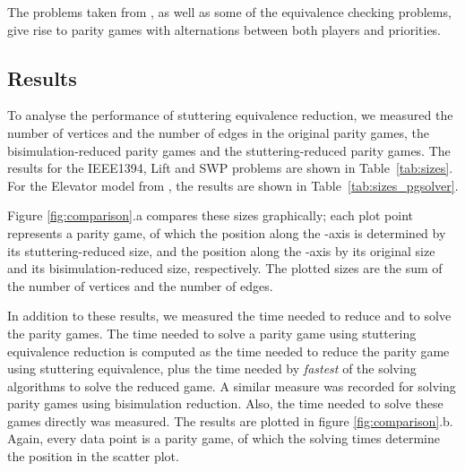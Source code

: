 \documentclass[a4paper]{llncs}
\begin{document}
The problems taken from \cite{FL:09}, as well as some of the equivalence
checking problems, give rise to parity games with alternations between both
players and priorities.

\subsection{Results}

To analyse the performance of stuttering equivalence reduction, we measured the
number of vertices and the number of edges in the original parity games, the
bisimulation-reduced parity games and the stuttering-reduced parity games. The
results for the IEEE1394, Lift and SWP problems are shown in Table~\ref{tab:sizes}.
For the Elevator model from \cite{FL:09}, the results are shown
in Table~\ref{tab:sizes_pgsolver}.

Figure \ref{fig:comparison}.a compares these sizes graphically; each plot point
represents a parity game, of which the position along the -axis is determined
by its stuttering-reduced size, and the position along the -axis by its 
original size and its bisimulation-reduced size, respectively. The plotted sizes
are the sum of the number of vertices and the number of edges.

In addition to these results, we measured the time needed to reduce and to solve
the parity games. The time needed to solve a parity game using stuttering 
equivalence reduction is computed as the time needed to reduce the parity game
using stuttering equivalence, plus the time needed by \emph{fastest} of the 
solving algorithms to solve the reduced game. A similar measure was recorded for
solving parity games using bisimulation reduction. Also, the time needed to 
solve these games directly was measured. The results are plotted in figure
\ref{fig:comparison}.b. Again, every data point is a parity game, of which the
solving times determine the position in the scatter plot.
\end{document}
